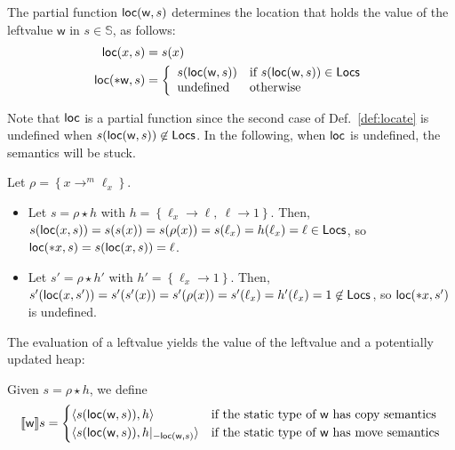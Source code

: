 \begin{definition}[Locate]\label{def:locate}
  The partial function $\loc(\mathsf{w},s)$ determines the location that holds
  the value of the leftvalue $\mathsf{w}$ in $s\in\mathbb{S}$, as follows:
  \begin{align*}
    \loc(x,s) &= s(x)\\
    \loc(*\mathsf{w},s) &= \left\{\begin{array}{ll}
      s(\loc(\mathsf{w},s)) & \text{if } s(\loc(\mathsf{w},s)) \in \Locs\\
      \text{undefined} & \text{otherwise}
    \end{array}\right.
  \end{align*}
\end{definition}

\noindent
Note that $\loc$ is a partial function since the second case of
Def.~\ref{def:locate} is undefined when
$s(\loc(\mathsf{w},s))\not\in\Locs$. In the following, when $\loc$ is undefined, the
semantics will be stuck.


\begin{example}
  Let $\rho = \left\{x\rightarrow^m\ell_x\right\}$.
  \begin{itemize}
    \item Let $s = \rho\star h$ with
    $h = \left\{\ell_x\rightarrow\ell,\ \ell\rightarrow 1\right\}$.
    Then, $s(\loc(x,s)) = s(s(x)) = s(\rho(x)) = s(\ell_x) =
    h(\ell_x) = \ell\in\Locs$, so
    $\loc(\mathtt{*}x,s)= s(\loc(x,s)) = \ell$.
    \item Let $s' = \rho\star h'$ with
    $h' = \left\{\ell_x\rightarrow 1\right\}$. Then,
    $s'(\loc(x,s')) = s'(s'(x)) = s'(\rho(x)) = s'(\ell_x) =
    h'(\ell_x) = 1 \not\in\Locs$, so $\loc(\mathtt{*}x,s')$ is undefined.
  \end{itemize}
\end{example}


The evaluation of a leftvalue yields the value of the leftvalue and a potentially updated heap:

\begin{definition}\label{def:semantics_leftvalues}
  Given $s=\rho\star h$, we define
  \[
  \den[\mathsf{w}]{s}=\begin{cases}
  \langle s(\loc(\mathsf{w},s)), h\rangle & \text{if the static type of $\mathsf{w}$ has copy semantics}\\
  \langle s(\loc(\mathsf{w},s)), h|_{-\loc(\mathsf{w},s)}\rangle & \text{if the static type of $\mathsf{w}$ has move semantics}
  \end{cases}
  \]
\end{definition}

